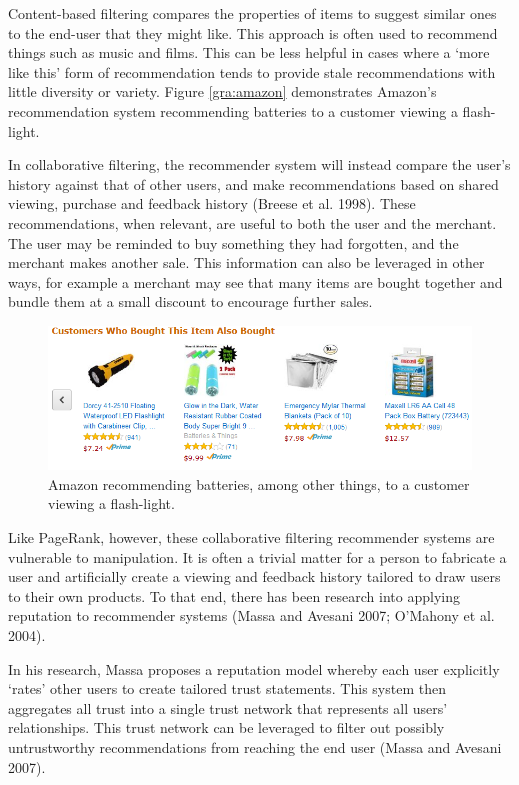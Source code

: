 \documentclass[]{final_report}
\begin{document}
Content-based filtering compares the properties of items to suggest similar ones to the end-user that they might like. This approach is often used to recommend things such as music and films. This can be less helpful in cases where a `more like this' form of recommendation tends to provide stale recommendations with little diversity or variety. Figure \ref{gra:amazon} demonstrates Amazon's recommendation system recommending batteries to a customer viewing a flash-light.

In collaborative filtering, the recommender system will instead compare the user's history against that of other users, and make recommendations based on shared viewing, purchase and feedback history (Breese et al. 1998). These recommendations, when relevant, are useful to both the user and the merchant. The user may be reminded to buy something they had forgotten, and the merchant makes another sale. This information can also be leveraged in other ways, for example a merchant may see that many items are bought together and bundle them at a small discount to encourage further sales.

\begin{figure}[ht!]
\centering
\includegraphics[width=140mm]{chap2/recommender.PNG}
\caption{Amazon recommending batteries, among other things, to a customer viewing a flash-light.}
\end{figure}\label{gra:amazon}

Like PageRank, however, these collaborative filtering recommender systems are vulnerable to manipulation. It is often a trivial matter for a person to fabricate a user and artificially create a viewing and feedback history tailored to draw users to their own products. To that end, there has been research into applying reputation to recommender systems (Massa and Avesani 2007; O'Mahony et al. 2004).

In his research, Massa proposes a reputation model whereby each user explicitly `rates' other users to create tailored trust statements. This system then aggregates all trust into a single trust network that represents all users' relationships. This trust network can be leveraged to filter out possibly untrustworthy recommendations from reaching the end user (Massa and Avesani 2007).
\end{document}
